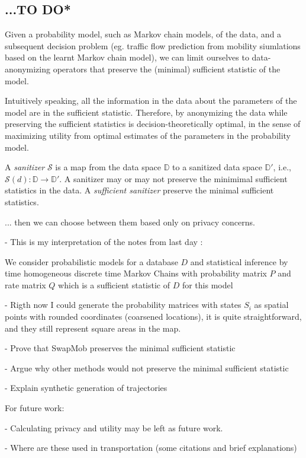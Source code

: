 \documentclass{llncs}
\begin{document}
\subsection{...TO DO*}

Given a probability model, such as Markov chain models, of the data, and a subsequent decision problem (eg. traffic flow prediction from mobility siumlations based on the learnt Markov chain model), we can limit ourselves to data-anonymizing operators that preserve the (minimal) sufficient statistic of the model.

Intuitively speaking, all the information in the data about the parameters of the model are in the sufficient statistic.
Therefore, by anonymizing the data while preserving the sufficient statistics is decision-theoretically optimal, in the sense of maximizing utility from optimal estimates of the parameters in the probability model.

A {\em sanitizer} $\mathcal{S}$ is a map from the data space $\mathbb{D}$ to a sanitized data space $\mathbb{D}'$, i.e., $\mathcal{S}(d): \mathbb{D} \to \mathbb{D}'$.
A sanitizer may or may not preserve the minimimal sufficient statistics in the data.
A {\em sufficient sanitizer} preserve the minimal sufficient statistics.

... then we can choose between them based only on privacy concerns.


- This is my interpretation of the notes from last day :

We consider probabilistic models for a database $D$ and statistical inference by time homogeneous discrete time Markov Chains with probability matrix $P$ and rate matrix $Q$ which is a sufficient statistic of $D$ for this model

- Rigth now I could generate the probability matrices with states $S_i$ as spatial points with rounded coordinates (coarsened locations), it is quite straightforward, and they still represent square areas in the map.

- Prove that SwapMob preserves the minimal sufficient statistic

- Argue why other methods would not preserve the minimal sufficient statistic

- Explain synthetic generation of trajectories

For future work:

- Calculating privacy and utility may be left as future work.



- Where are these used in transportation (some citations and brief explanations)
\end{document}

